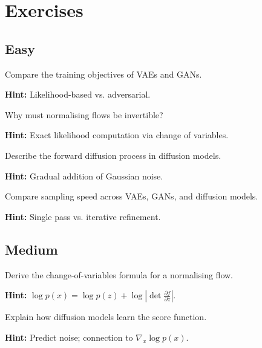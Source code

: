 
\section*{Exercises}

\subsection*{Easy}

\begin{problem}
Compare the training objectives of VAEs and GANs.

\textbf{Hint:} Likelihood-based vs. adversarial.
\end{problem}

\begin{problem}
Why must normalising flows be invertible?

\textbf{Hint:} Exact likelihood computation via change of variables.
\end{problem}

\begin{problem}
Describe the forward diffusion process in diffusion models.

\textbf{Hint:} Gradual addition of Gaussian noise.
\end{problem}

\begin{problem}
Compare sampling speed across VAEs, GANs, and diffusion models.

\textbf{Hint:} Single pass vs. iterative refinement.
\end{problem}

\subsection*{Medium}

\begin{problem}
Derive the change-of-variables formula for a normalising flow.

\textbf{Hint:} $\log p(x) = \log p(z) + \log|\det \frac{\partial f}{\partial z}|$.
\end{problem}

\begin{problem}
Explain how diffusion models learn the score function.

\textbf{Hint:} Predict noise; connection to $\nabla_x \log p(x)$.
\end{problem}

